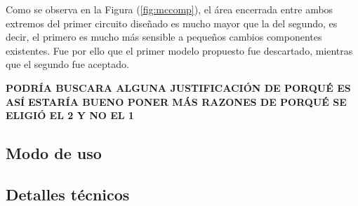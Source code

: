 \documentclass[a4paper]{article}
\begin{document}
Como se observa en la Figura (\ref{fig:mccomp}), el área encerrada entre ambos extremos del primer circuito diseñado es mucho mayor que la del segundo, es decir, el primero es mucho más sensible a pequeños cambios componentes existentes. Fue por ello que el primer modelo propuesto fue descartado, mientras que el segundo fue aceptado. 

\begin{center}
	\textbf{PODRÍA BUSCARA ALGUNA JUSTIFICACIÓN DE PORQUÉ ES ASÍ}
	\textbf{ESTARÍA BUENO PONER MÁS RAZONES DE PORQUÉ SE ELIGIÓ EL 2 Y NO EL 1}
\end{center}

\subsection{Modo de uso}


\subsection{Detalles técnicos}

\end{document}
